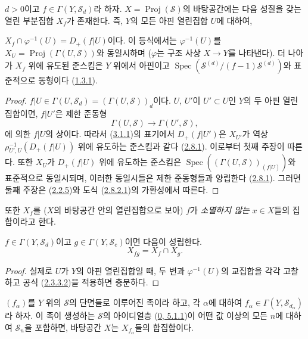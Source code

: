 \begin{proposition}[3.1.4]
\label{II.3.1.4-ko}
$d>0$이고 $f\in\Gamma(Y,\mathcal{S}_d)$라 하자.
$X=\operatorname{Proj}(\mathcal{S})$의 바탕공간에는 다음 성질을 갖는
열린 부분집합 $X_f$가 존재한다. 즉, $Y$의 모든 아핀 열린집합 $U$에 대하여,


$X_f\cap\varphi^{-1}(U)=D_+(f|U)$이다. 이 등식에서는
$\varphi^{-1}(U)$를
$X_U=\operatorname{Proj}(\Gamma(U,\mathcal{S}))$와 동일시하며
($\varphi$는 구조 사상 $X\to Y$를 나타낸다). 더 나아가 $X_f$ 위에
유도된 준스킴은 $Y$ 위에서 아핀이고
$\operatorname{Spec}(\mathcal{S}^{(d)}/(f-1)\mathcal{S}^{(d)})$와
표준적으로 동형이다
(\hyperref[II.1.3.1-ko]{1.3.1}).
\end{proposition}

\begin{proof}
$f|U\in\Gamma(U,\mathcal{S}_d)=(\Gamma(U,\mathcal{S}))_d$이다.
$U$, $U'$이 $U'\subset U$인 $Y$의 두 아핀 열린집합이면, $f|U'$은
제한 준동형
\[
  \Gamma(U,\mathcal{S})\longrightarrow\Gamma(U',\mathcal{S}),
\]
에 의한 $f|U$의 상이다. 따라서
(\hyperref[II.3.1.1-ko]{3.1.1})의 표기에서 $D_+(f|U')$은
$X_{U'}$가 역상 $\rho_{U',U}^{-1}(D_+(f|U))$ 위에 유도하는
준스킴과 같다
(\hyperref[II.2.8.1-ko]{2.8.1}). 이로부터 첫째 주장이 따른다. 또한
$X_U$가 $D_+(f|U)$ 위에 유도하는 준스킴은
$\operatorname{Spec}((\Gamma(U,\mathcal{S}))_{(f|U)})$와 표준적으로
동일시되며, 이러한 동일시들은 제한 준동형들과 양립한다
(\hyperref[II.2.8.1-ko]{2.8.1}). 그러면 둘째 주장은
(\hyperref[II.2.2.5-ko]{2.2.5})와 도식
(\hyperref[II.2.8.2.1-ko]{2.8.2.1})의 가환성에서 따른다.
\end{proof}

또한 $X_f$를 ($X$의 바탕공간 안의 열린집합으로 보아) $f$가
\emph{소멸하지 않는} $x\in X$들의 집합이라고 한다.

\begin{corollary}[3.1.5]
\label{II.3.1.5-ko}
$f\in\Gamma(Y,\mathcal{S}_d)$이고
$g\in\Gamma(Y,\mathcal{S}_e)$이면 다음이 성립한다.
\[
\label{II.3.1.5.1-ko}
  X_{fg}=X_f\cap X_g.
\tag{3.1.5.1}
\]
\end{corollary}

\begin{proof}
실제로 $U$가 $Y$의 아핀 열린집합일 때, 두 변과
$\varphi^{-1}(U)$의 교집합을 각각 고찰하고 공식
(\hyperref[II.2.3.3.2-ko]{2.3.3.2})을 적용하면 충분하다.
\end{proof}

\begin{corollary}[3.1.6]
\label{II.3.1.6-ko}
$(f_\alpha)$를 $Y$ 위의 $\mathcal{S}$의 단면들로 이루어진 족이라 하고,
각 $\alpha$에 대하여
$f_\alpha\in\Gamma(Y,\mathcal{S}_{d_\alpha})$라 하자. 이 족이 생성하는
$\mathcal{S}$의 아이디얼층
(\hyperref[0.5.1.1-ko]{0, 5.1.1})이 어떤 값 이상의 모든 $n$에 대하여
$\mathcal{S}_n$을 포함하면, 바탕공간 $X$는 $X_{f_\alpha}$들의
합집합이다.
\end{corollary}

